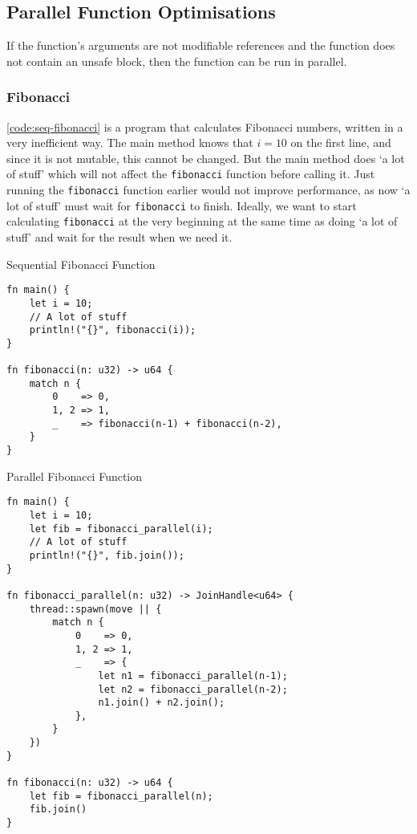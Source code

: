 \documentclass[conference]{IEEEtran}
\begin{document}

\subsection{Parallel Function Optimisations}
If the function's arguments are not modifiable references and the function does not contain an unsafe block, then the function can be run in parallel.

\subsubsection{Fibonacci}

\autoref{code:seq-fibonacci} is a program that calculates Fibonacci numbers, written in a very inefficient way. The main method knows that $i = 10$ on the first line, and since it is not mutable, this cannot be changed. But the main method does `a lot of stuff' which will not affect the \texttt{fibonacci} function before calling it. Just running the \texttt{fibonacci} function earlier would not improve performance, as now `a lot of stuff' must wait for \texttt{fibonacci} to finish. Ideally, we want to start calculating \texttt{fibonacci} at the very beginning at the same time as doing `a lot of stuff' and wait for the result when we need it.

\begin{algorithm}
\caption{Sequential Fibonacci Function}
\label{code:seq-fibonacci}
\begin{verbatim}
fn main() {
    let i = 10;
    // A lot of stuff
    println!("{}", fibonacci(i));
}

fn fibonacci(n: u32) -> u64 {
    match n {
        0    => 0,
        1, 2 => 1,
        _    => fibonacci(n-1) + fibonacci(n-2),
    }
}
\end{verbatim}
\end{algorithm}

\begin{algorithm}
\caption{Parallel Fibonacci Function}
\label{code:par-fibonacci}
\begin{verbatim}
fn main() {
    let i = 10;
    let fib = fibonacci_parallel(i);
    // A lot of stuff
    println!("{}", fib.join());
}

fn fibonacci_parallel(n: u32) -> JoinHandle<u64> {
    thread::spawn(move || {
        match n {
            0    => 0,
            1, 2 => 1,
            _    => {
                let n1 = fibonacci_parallel(n-1);
                let n2 = fibonacci_parallel(n-2);
                n1.join() + n2.join();
            },
        }
    })
}

fn fibonacci(n: u32) -> u64 {
    let fib = fibonacci_parallel(n);
    fib.join()
}
\end{verbatim}
\end{algorithm}
\end{document}
